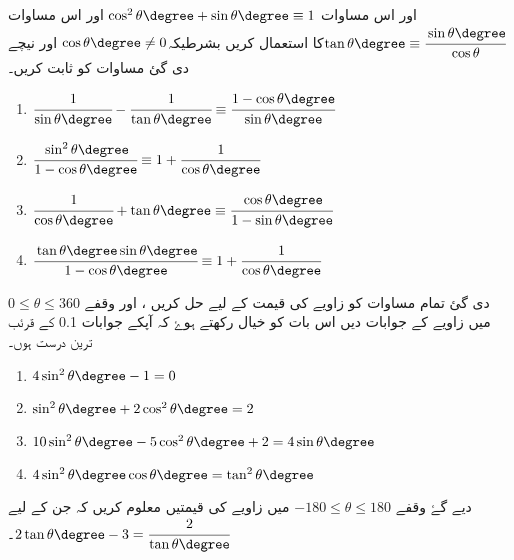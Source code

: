 \begin{enumerate}
                                                                                                                                                                                                                                                                                                                                                                                                                                                                                                                                   
\end{enumerate}

اور اس مساوات  \(\cos^2\theta\degree+\sin\theta\degree \equiv1\) اور اس مساوات \(\tan \theta\degree\equiv\cfrac{\sin\theta\degree}{\cos\theta}\)کا استعمال کریں بشرطیکہ\(\cos\theta\degree \neq 0 \) اور نیچے دی گئ مساوات کو ثابت کریں۔
\begin{enumerate}
\item
\(\cfrac{1}{\sin\theta\degree}-\cfrac{1}{\tan\theta\degree}\equiv\cfrac{1-\cos\theta\degree}{\sin\theta\degree}\)
\item
 \(\cfrac{\sin^2\theta\degree}{1-\cos\theta\degree}\equiv 1+\cfrac{1}{\cos\theta\degree}\)
\item
\(\cfrac{1}{\cos\theta\degree}+\tan\theta\degree\equiv\cfrac{\cos\theta\degree}{1-\sin\theta\degree} \)
\item
\(\cfrac{\tan\theta\degree\sin\theta\degree}{1-\cos\theta\degree}\equiv1+\cfrac{1}{\cos\theta\degree} \)
\end{enumerate}
دی گئ تمام مساوات کو زاویے کی قیمت کے لیے حل کریں ، اور وقفے  \(  0\le \theta\le 360\) میں زاویے کے جوابات دیں اس بات کو خیال رکھتے ہوۓ کہ آپکے جوابات 0.1 کے قرئب ترین درست ہوں۔ 
\begin{enumerate}
\item     \(4\sin^2\theta\degree-1=0\)
\item      \(\sin^2\theta\degree+2\cos^2\theta\degree=2 \)
\item \(10\sin^2\theta\degree-5\cos^2\theta\degree+2=4\sin\theta\degree \)
\item    \(4\sin^2\theta\degree\cos\theta\degree=\tan^2\theta\degree\)
\end{enumerate}
 دیے گۓ وقفے 
\(-180\le \theta\le 180\) میں   زاویے کی قیمتیں معلوم کریں کہ جن کے لیے  \(2\tan\theta\degree-3=\cfrac{2}{\tan\theta\degree}\)۔



